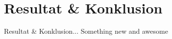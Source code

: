 


\section{Resultat \& Konklusion}
\begin{frame}{Resultat \& Konklusion}{...}
	Something new and awesome
\end{frame}







%
%
%













